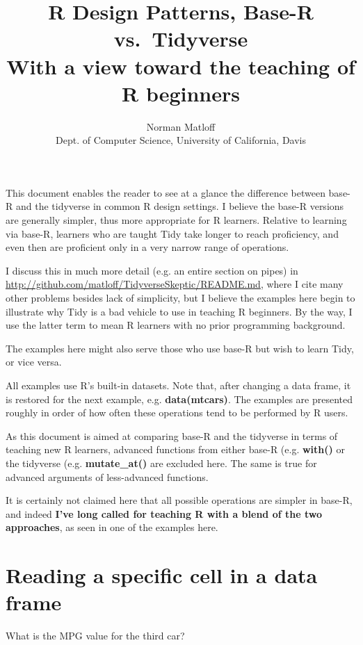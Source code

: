\documentclass[11pt]{article}
\title{R Design Patterns, Base-R vs.\ Tidyverse \\
   With a view toward the teaching of R beginners}
\author{Norman Matloff \\
      Dept. of Computer Science, University of California, Davis}
\begin{document}
\maketitle

This document enables the reader to see at a glance the difference
between base-R and the tidyverse in common R design settings.  I believe
the base-R versions are generally simpler, thus more appropriate for R
learners.  Relative to learning via base-R, learners who are taught Tidy
take longer to reach proficiency, and even then are proficient only in a
very narrow range of operations.

I discuss this in much more detail (e.g. an entire section on
pipes) in \url{http://github.com/matloff/TidyverseSkeptic/README.md},
where I cite many other problems besides lack of simplicity, but I
believe the examples here begin to illustrate why Tidy is a bad vehicle
to use in teaching R beginners.  By the way, I use the latter term to
mean R learners with no prior programming background.

The examples here might also serve those who use base-R but wish to
learn Tidy, or vice versa.

All examples use R's built-in datasets.  Note that, after changing a data
frame, it is restored for the next example, e.g. \textbf{data(mtcars)}.
The examples are presented roughly in order of how often these
operations tend to be performed by R users.

As this document is aimed at comparing base-R and the tidyverse in terms
of teaching new R learners, advanced functions from either base-R (e.g.
\textbf{with()} or the tidyverse (e.g. \textbf{mutate\_at()} are excluded
here.  The same is true for advanced arguments of less-advanced
functions.

It is certainly not claimed here that all possible operations are
simpler in base-R, and indeed \textbf{ I've long called for teaching R
with a blend of the two approaches}, as seen in one of the examples
here.  

\section*{Reading a specific cell in a data frame}

What is the MPG value for the third car? 
\end{document}
